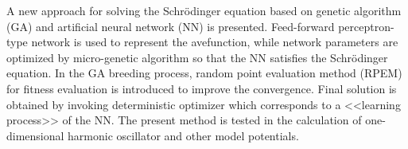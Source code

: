 A new approach for solving the Schr\"odinger equation based on
genetic algorithm (GA) and artificial neural network (NN) is
presented. Feed-forward perceptron-type network is used to
represent the avefunction, while network parameters are 
optimized by micro-genetic algorithm so that the NN
satisfies the Schr\"odinger equation.
In the GA breeding process, random point evaluation method
(RPEM) for fitness evaluation is introduced to improve the
convergence. Final solution is obtained by invoking
deterministic optimizer which corresponds to a <<learning
process>> of the NN. The present method is tested in the
calculation of one-dimensional harmonic oscillator and
other model potentials.